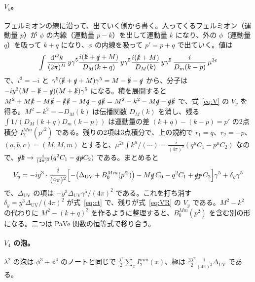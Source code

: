 \documentclass[a4paper,10pt]{ltjsarticle}
\newcommand{\dd}{\mathrm{d}}
\begin{document}
\paragraph{$V_y$。}フェルミオンの線に沿って、出ていく側から書く。入ってくるフェルミオン（運動量 $p$）が $\phi$ の内線（運動量 $p-k$）を出して運動量 $k$ になり、外の $\phi$（運動量 $q$）を吸って $k+q$ になり、$\phi$ の内線を吸って $p'=p+q$ で出ていく。値は
\begin{equation*}
\int\frac{\dd^Dk}{(2\pi)^D}\,y\gamma^5\frac{i(\slashed k+\slashed q+M)}{D_M(k+q)}\,y\gamma^5\frac{i(\slashed k+M)}{D_M(k)}\,y\gamma^5\,\frac{i}{D_m(k-p)}\,\mu^{3\epsilon}
\end{equation*}
で、$i^3=-i$ と $\gamma^5(\slashed k+\slashed q+M)\gamma^5=M-\slashed k-\slashed q$ から、分子は $-iy^3(M-\slashed k-\slashed q)(M+\slashed k)\gamma^5$ になる。積を展開すると $M^2+M\slashed k-M\slashed k-\slashed k\slashed k-M\slashed q-\slashed q\slashed k=M^2-k^2-M\slashed q-\slashed q\slashed k$ で、式~\eqref{eq:V} の $V_y$ を得る。$M^2-k^2=-D_M(k)$ は伝播関数 $D_M(k)$ を消し、残る $\int1/(D_M(k+q)D_m(k-p))$ は運動量の差 $(k+q)-(k-p)=p'$ の2点積分 $I_2^{Mm}(p'^2)$ である。残りの2項は3点積分で、上の規約で $r_1=q$、$r_2=-p$、$(a,b,c)=(M,M,m)$ とすると、$\mu^{2\epsilon}\int k^\mu/(\cdots)=\frac{i}{(4\pi)^2}(q^\mu C_1-p^\mu C_2)$ なので、$\slashed q\slashed k\to\frac{i}{(4\pi)^2}(q^2C_1-\slashed q\slashed pC_2)$ である。まとめると
\begin{equation*}
V_y=-iy^3\cdot\frac{i}{(4\pi)^2}\Bigl[-\bigl(\Delta_{\mathrm{UV}}+B_0^{Mm}(p'^2)\bigr)-M\slashed q\,C_0-q^2C_1+\slashed q\slashed p\,C_2\Bigr]\gamma^5+\delta_y\gamma^5
\end{equation*}
で、$\Delta_{\mathrm{UV}}$ の項は $-y^3\Delta_{\mathrm{UV}}\gamma^5/(4\pi)^2$ である。これを打ち消す $\delta_y=y^3\Delta_{\mathrm{UV}}/(4\pi)^2$ が式~\eqref{eq:ct} で、残りが式~\eqref{eq:VR} の $V_y$ である。$M^2-k^2$ の代わりに $M^2-(k+q)^2$ を作るように整理すると、$B_0^{Mm}(p^2)$ を含む別の形になる。二つは PaVe 関数の恒等式で移り合う。

\paragraph{$V_4$ の泡。}$\lambda^2$ の泡は $\phi^3+\phi^4$ のノートと同じで $\frac{\lambda^2}{2}\sum_xI_2^{mm}(x)$、極は $\frac{3\lambda^2}{2}\frac{i}{(4\pi)^2}\Delta_{\mathrm{UV}}$ である。
\end{document}
